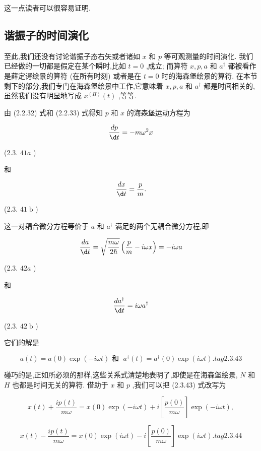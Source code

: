 \documentclass[lang=cn,newtx,10pt,scheme=chinese,thmcnt=section]{elegantbook}
\begin{document}
这一点读者可以很容易证明.

\subsection*{谐振子的时间演化}
至此,我们还没有讨论谐振子态右矢或者诸如 $x$ 和 $p$ 等可观测量的时间演化. 我们已经做的一切都是假定在某个瞬时,比如 $t = 0$ ,成立; 而算符 $x, p, a$ 和 ${a}^{ \dagger }$ 都被看作是薛定谔绘景的算符 (在所有时刻) 或者是在 $t = 0$ 时的海森堡绘景的算符. 在本节剩下的部分,我们专门在海森堡绘景中工作,它意味着 $x, p, a$ 和 ${a}^{ \dagger }$ 都是时间相关的,虽然我们没有明显地写成 ${x}^{\left( H\right) }\left( t\right)$ ,等等.

由 (2.2.32) 式和 (2.2.33) 式得知 $p$ 和 $x$ 的海森堡运动方程为

$$
\frac{dp}{\d t} = - m{\omega }^{2}x
$$

(2.3. ${41a}$ )

和

$$
\frac{dx}{\d t} = \frac{p}{m}.
$$

(2.3. ${41}\mathrm{\;b}$ )

这一对耦合微分方程等价于 $a$ 和 ${a}^{ \dagger }$ 满足的两个无耦合微分方程,即

$$
\frac{da}{\d t} = \sqrt{\frac{m\omega }{2\hbar }}\left( {\frac{p}{m} - {i\omega x}}\right) = - {i\omega a}
$$

(2.3. ${42a}$ )

和

$$
\frac{d{a}^{ \dagger }}{\d t} = {i\omega }{a}^{ \dagger }
$$

(2.3. ${42}\mathrm{\;b}$ )

它们的解是

$$
a\left( t\right) = a\left( 0\right) \exp \left( {-{i\omega t}}\right) \text{ 和 }\;{a}^{ \dagger }\left( t\right) = {a}^{ \dagger }\left( 0\right) \exp \left( {i\omega t}\right) . tag{2.3.43}
$$

碰巧的是,正如所必须的那样,这些关系式清楚地表明了,即使是在海森堡绘景, $N$ 和 $H$ 也都是时间无关的算符. 借助于 $x$ 和 $p$ ,我们可以把 (2.3.43) 式改写为

$$
x\left( t\right) + \frac{{ip}\left( t\right) }{m\omega } = x\left( 0\right) \exp \left( {-{i\omega t}}\right) + i\left\lbrack \frac{p\left( 0\right) }{m\omega }\right\rbrack \exp \left( {-{i\omega t}}\right) ,
$$

$$
x\left( t\right) - \frac{{ip}\left( t\right) }{m\omega } = x\left( 0\right) \exp \left( {i\omega t}\right) - i\left\lbrack \frac{p\left( 0\right) }{m\omega }\right\rbrack \exp \left( {i\omega t}\right) . tag{2.3.44}
$$
\end{document}

